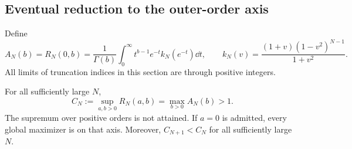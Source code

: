 \subsection{Eventual reduction to the outer-order axis}

Define
\begin{equation}\label{ord:eq:axis}
 A_N(b)=R_N(0,b)
 =\frac1{\Gamma(b)}\int_0^\infty t^{b-1}e^{-t}
       k_N(e^{-t})\dd t,
 \qquad
 k_N(v)=\frac{(1+v)(1-v^2)^{N-1}}{1+v^2}.
\end{equation}
All limits of truncation indices in this section are through positive
integers.

\begin{theorem}\label{ord:thm:axis-reduction}
For all sufficiently large $N$,
\begin{equation}\label{ord:eq:axis-reduction}
 C_N:=\sup_{a,b>0}R_N(a,b)=\max_{b>0}A_N(b)>1.
\end{equation}
The supremum over positive orders is not attained. If $a=0$ is admitted,
every global maximizer is on that axis. Moreover, $C_{N+1}<C_N$ for
all sufficiently large $N$.
\end{theorem}

